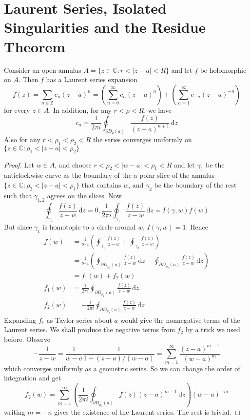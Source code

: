 \section{Laurent Series, Isolated Singularities and the Residue Theorem}
\begin{theorem}
    Consider an open annulus $A=\{z\in\mathbb C:r<|z-a|<R\}$ and let $f$ be holomorphic on $A$.
    Then $f$ has a Laurent series expansion
    $$f(z)=\sum_{n\in\mathbb Z}c_n(z-a)^n=\left( \sum_{n=0}^\infty c_n(z-a)^n \right)+\left( \sum_{n=1}^\infty c_{-n}(z-a)^{-n} \right)$$
    for every $z\in A$.
    In addition, for any $r<\rho<R$, we have
    $$c_n=\frac{1}{2\pi i}\oint_{\partial D_\rho(a)}\frac{f(z)}{(z-a)^{n+1}}\,\mathrm dz$$
    Also for any $r<\rho_1<\rho_2<R$ the series converges uniformly on $\{z\in\mathbb C:\rho_1<|z-a|<\rho_2\}$
\end{theorem}
\begin{proof}
    Let $w\in A$, and choose $r<\rho_2<|w-a|<\rho_1<R$ and let $\gamma_1$ be the anticlockwise curve as the boundary of the a polar slice of the annulus $\{z\in\mathbb C:\rho_2<|z-a|<\rho_1\}$ that contains $w$, and $\gamma_2$ be the boundary of the rest such that $\gamma_{1,2}$ agrees on the slices.
    Now
    $$\oint_{\gamma_2}\frac{f(z)}{z-w}\,\mathrm dz=0,\frac{1}{2\pi i}\oint_{\gamma_1}\frac{f(z)}{z-w}\,\mathrm dz=I(\gamma,w)f(w)$$
    But since $\gamma_1$ is homotopic to a circle around $w$, $I(\gamma,w)=1$.
    Hence
    \begin{align*}
        f(w)&=\frac{1}{2\pi i}\left( \oint_{\gamma_1}\frac{f(z)}{z-w}+\oint_{\gamma_2}\frac{f(z)}{z-w} \right)\\
        &=\frac{1}{2\pi i}\left( \oint_{\partial D_{\rho_1}(a)}\frac{f(z)}{z-w}\,\mathrm dz-\oint_{\partial D_{\rho_2}(a)}\frac{f(z)}{z-w}\,\mathrm dz \right)\\
        &=f_1(w)+f_2(w)\\
        f_1(w)&=\frac{1}{2\pi i}\oint_{\partial D_{\rho_1}(a)}\frac{f(z)}{z-w}\,\mathrm dz\\
        f_2(w)&=-\frac{1}{2\pi i}\oint_{\partial D_{\rho_2}(a)}\frac{f(z)}{z-w}\,\mathrm dz
    \end{align*}
    Expanding $f_1$ as Taylor series about $a$ would give the nonnegative terms of the Laurent series.
    We shall produce the negative terms from $f_2$ by a trick we used before.
    Observe
    $$-\frac{1}{z-w}=\frac{1}{w-a}\frac{1}{1-(z-a)/(w-a)}=\sum_{m=1}^\infty\frac{(z-a)^{m-1}}{(w-a)^m}$$
    which converges uniformly as a geometric series.
    So we can change the order of integration and get
    $$f_2(w)=\sum_{m=1}^\infty\left(\frac{1}{2\pi i}\oint_{\partial D_{\rho_2}(a)}f(z)(z-a)^{m-1}\,\mathrm dz\right)(w-a)^{-m}$$
    writing $m=-n$ gives the existence of the Laurent series.
    The rest is trivial.
\end{proof}

